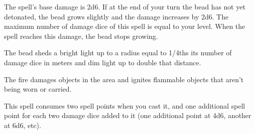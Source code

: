     The spell's base damage is 2d6.
    If at the end of your turn the bead has not yet detonated, the bead grows slightly and the damage increases by 2d6.
    The maximum number of damage dice of this spell is equal to your level.
    When the spell reaches this damage, the bead stops growing.

    The bead sheds a bright light up to a radius equal to 1/4ths its number of damage dice in meters and dim light up to double that distance.

    The fire damages objects in the area and ignites flammable objects that aren't being worn or carried.

    This spell consumes two spell points when you cast it, and one additional spell point for each two damage dice added to it (one additional point at 4d6, another at 6d6, etc).

